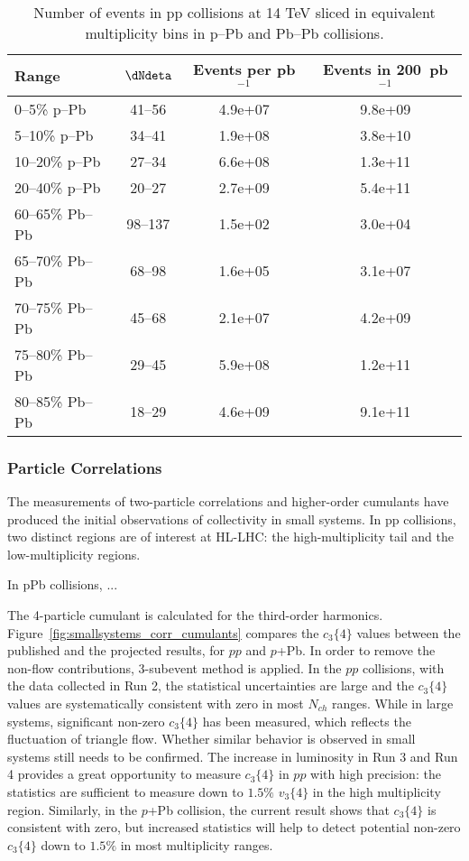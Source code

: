 \documentclass[../report.tex]{subfiles}
\begin{document}
\begin{table}
\centering
\begin{tabular}{l|c|c|c}
Range & $\dNdeta$ & Events per pb$^{-1}$ & Events in 200~pb$^{-1}$ \\
\hline
0--5\% p--Pb   & 41--56        & 4.9e+07       & 9.8e+09 \\
5--10\% p--Pb  & 34--41        & 1.9e+08       & 3.8e+10 \\
10--20\% p--Pb & 27--34        & 6.6e+08       & 1.3e+11 \\
20--40\% p--Pb & 20--27        & 2.7e+09       & 5.4e+11 \\
\hline
60--65\% Pb--Pb    & 98--137       & 1.5e+02       & 3.0e+04 \\
65--70\% Pb--Pb    & 68--98        & 1.6e+05       & 3.1e+07 \\ 
70--75\% Pb--Pb    & 45--68        & 2.1e+07       & 4.2e+09 \\
75--80\% Pb--Pb    & 29--45        & 5.9e+08       & 1.2e+11 \\
80--85\% Pb--Pb    & 18--29        & 4.6e+09       & 9.1e+11 \\
\hline
\end{tabular}
\caption{Number of events in pp collisions at 14 TeV sliced in equivalent multiplicity bins in p--Pb and Pb--Pb collisions.}
\end{table}



\subsubsection{Particle Correlations}

The measurements of two-particle correlations and higher-order cumulants have produced the initial observations of collectivity in small systems. In pp collisions, two distinct regions are of interest at HL-LHC: the high-multiplicity tail and the low-multiplicity regions. 

In pPb collisions, ...

The 4-particle cumulant is calculated for the third-order harmonics. Figure~\ref{fig:smallsystems_corr_cumulants} compares the $c_3\{4\}$ values between the published and the projected results, for $pp$ and $p$+Pb. In order to remove the non-flow contributions, 3-subevent method is applied. In the $pp$ collisions, with the data collected in Run 2, the statistical uncertainties are large and the $c_3\{4\}$ values are systematically consistent with zero in most $N_{ch}$ ranges. While in large systems, significant non-zero $c_3\{4\}$ has been measured, which reflects the fluctuation of triangle flow. Whether similar behavior is observed in small systems still needs to be confirmed. The increase in luminosity in Run 3 and Run 4 provides a great opportunity to measure $c_3\{4\}$ in $pp$ with high precision: the statistics are sufficient to measure down to $1.5\%$ $v_3\{4\}$ in the high multiplicity region. Similarly, in the $p$+Pb collision, the current result shows that $c_3\{4\}$ is consistent with zero, but increased statistics will help to detect potential non-zero $c_3\{4\}$ down to $1.5\%$ in most multiplicity ranges.
\end{document}

